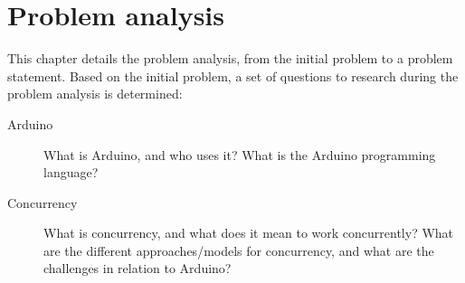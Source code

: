\chapter{Problem analysis}\label{cha:problemanalysis}
This chapter details the problem analysis, from the initial problem to a problem statement. Based on the initial problem, a set of questions to research during the problem analysis is determined:

\begin{description}
    \item[Arduino] What is Arduino, and who uses it? What is the Arduino programming language?
    \item[Concurrency] What is concurrency, and what does it mean to work concurrently? What are the different approaches/models for concurrency, and what are the challenges in relation to Arduino?
\end{description}





